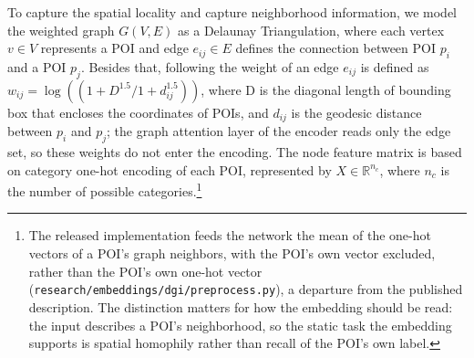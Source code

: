 To capture the spatial locality and capture neighborhood information, we model the weighted graph $G(V, E)$ as a Delaunay Triangulation, where each vertex $v \in V$ represents a POI and edge $e_{ij} \in E$ defines the connection between POI $p_i$ and a POI $p_j$. Besides that, following \cite{huang2022estimating} the weight of an edge $e_{ij}$ is defined as $w_{ij} = \log((1+D^{1.5}/1+d_{ij}^{1.5}))$, where D is the diagonal length of bounding box that encloses the coordinates of POIs, and $d_{ij}$ is the geodesic distance between $p_{i}$ and $p_{j}$; the graph attention layer of the encoder reads only the edge set, so these weights do not enter the encoding. The node feature matrix is based on category one-hot encoding of each POI, represented by $X \in \mathbb{R}^{n_c}$, where $n_c$ is the number of possible categories.\footnote{The released implementation feeds the network the mean of the one-hot vectors of a POI's graph neighbors, with the POI's own vector excluded, rather than the POI's own one-hot vector (\texttt{research/embeddings/dgi/preprocess.py}), a departure from the published description. The distinction matters for how the embedding should be read: the input describes a POI's neighborhood, so the static task the embedding supports is spatial homophily rather than recall of the POI's own label.}

